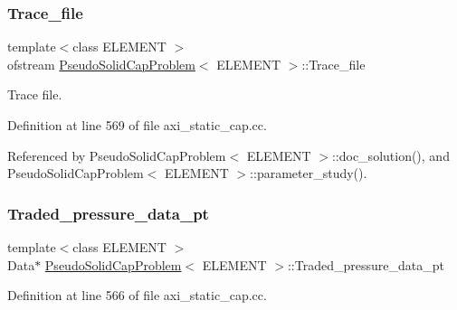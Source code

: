 \mbox{\label{classPseudoSolidCapProblem_a81d2d9915ba7d9a9a691ca2f2080b6b4}} 
\subsubsection{\texorpdfstring{Trace\+\_\+file}{Trace\_file}}
{\footnotesize\ttfamily template$<$class E\+L\+E\+M\+E\+NT $>$ \\
ofstream \hyperlink{classPseudoSolidCapProblem}{Pseudo\+Solid\+Cap\+Problem}$<$ E\+L\+E\+M\+E\+NT $>$\+::Trace\+\_\+file\hspace{0.3cm}{\ttfamily [private]}}



Trace file. 



Definition at line 569 of file axi\+\_\+static\+\_\+cap.\+cc.



Referenced by Pseudo\+Solid\+Cap\+Problem$<$ E\+L\+E\+M\+E\+N\+T $>$\+::doc\+\_\+solution(), and Pseudo\+Solid\+Cap\+Problem$<$ E\+L\+E\+M\+E\+N\+T $>$\+::parameter\+\_\+study().

\mbox{\label{classPseudoSolidCapProblem_a073f0857df471e2f165d57828511d835}} 
\subsubsection{\texorpdfstring{Traded\+\_\+pressure\+\_\+data\+\_\+pt}{Traded\_pressure\_data\_pt}}
{\footnotesize\ttfamily template$<$class E\+L\+E\+M\+E\+NT $>$ \\
Data$\ast$ \hyperlink{classPseudoSolidCapProblem}{Pseudo\+Solid\+Cap\+Problem}$<$ E\+L\+E\+M\+E\+NT $>$\+::Traded\+\_\+pressure\+\_\+data\+\_\+pt\hspace{0.3cm}{\ttfamily [private]}}



Definition at line 566 of file axi\+\_\+static\+\_\+cap.\+cc.



